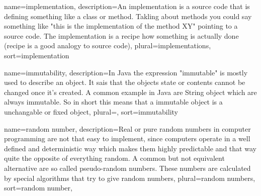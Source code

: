 {
	name=implementation,
	description={An implementation is a source code that is defining
		something like a class or method. Takling about methods
		you could say something like "this is the implementation
		of the method XY" pointing to a source code. The 
		implementation is a recipe how something is actually 
		done (recipe is a good analogy to source code)},
	plural=implementations,
	sort=implementation
}

{
	name=immutability,
	description={In Java the expression "immutable" is mostly used to
		describe an object. It sais that the objects state or 
		contents cannot be changed once it's created. A common
		example in Java are String object which are always
		immutable. So in short this means that a immutable object
		is a unchangable or fixed object},
	plural=,
	sort=immutability
}

{
	name={random number},
	description={Real or pure random numbers in computer programming are
		not that easy to implement, since computers operate in a
		well defined and deterministic way which makes them 
		highly predictable and that way quite the opposite of 
		everything random. A common but not equivalent alternative
		are so called pseudo-random numbers. These numbers are 
		calculated by special algorithms that try to give 
		random numbers},
	plural={random numbers},
	sort={random number},
}
